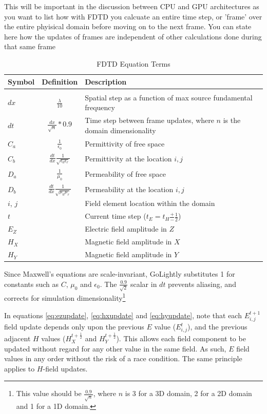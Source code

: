 This will be important in the discussion between CPU and GPU architectures as you want to list how with FDTD you calcuate an entire time step, or 'frame' over the entire phyisical domain before moving on to the next frame.  You can state here how the updates of frames are independent of other calculations done during that same frame
\fi

\begin{table}[h!]
	\centering
	\caption{FDTD Equation Terms}
	\label{tab:modelColorComponentUsage}
	\begin{tabular}{l | c | l}
		Symbol	& Definition & Description \\
		\hline				\\										 	 
		$dx$ 	& $\frac{\lambda}{10}$ 			& Spatial step as a function of max source  fundamental frequency 					\\
		$dt$ 	& $\frac{dx}{\sqrt{n}} * 0.9$		& Time step between frame updates, where $n$ is the domain dimensionality \\		$C_a$	& $\frac{1}{\epsilon_0}$ & Permittivity of free space	\\
		$C_b$	& $\frac{dt}{dx}  \frac{1}{\sqrt{\epsilon_0 \epsilon_r}}$ & Permittivity at the location $i,j$\\
		$D_a$	& $\frac{1}{\mu_0}$	& Permeability of free space \\
		$D_b$	& $\frac{dt}{dx}\frac{1}{\sqrt{\mu_0 \mu_r}}$	& Permeability at the location $i,j$\\
		$i$, $j$ 	& &	Field element location within the domain  \\
		$t$   	& &	Current time step ($t_E = t_H \frac{+}{-}\frac{1}{2}$) \\
		$E_Z$ 	& & Electric field amplitude in $Z$ \\
		$H_X$ 	& & Magnetic field amplitude in $X$ \\
		$H_Y$	& & Magnetic field amplitude in $Y$ \\
	\end{tabular}
\end{table}

Since Maxwell's equations are scale-invariant, GoLightly substitutes 1 for constants such as $C$, $\mu_0$ and $\epsilon_0$. The $\frac{0.9}{\sqrt{2}}$ scalar in $dt$ prevents aliasing, and corrects for simulation dimensionality\footnote{This value should be $\frac{0.9}{\sqrt{n}}$, where $n$ is 3 for a 3D domain, 2 for a 2D domain and 1 for a 1D domain.} 

In equations \ref{eq:ezupdate}, \ref{eq:hxupdate} and \ref{eq:hyupdate}, note that each $E_{i,j}^{t+1}$ field update depends only upon the previous $E$ value ($E_{i,j}^{t}$), and the previous adjacent $H$ values ($H_X^{t+\frac{1}{2}}$ and $H_Y^{t+\frac{1}{2}}$). This allows each field component to be updated without regard for any other value in the same field. As such, $E$ field values in any order without the risk of a race condition. The same principle applies to $H$-field updates.  

